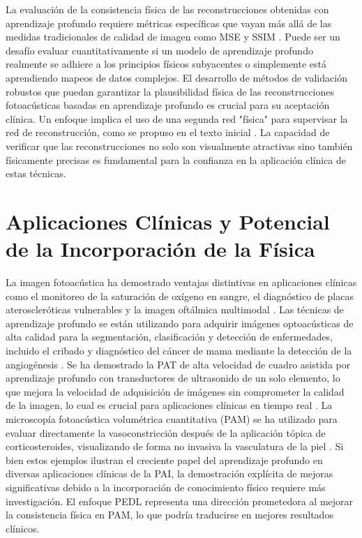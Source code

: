 La evaluación de la consistencia física de las reconstrucciones obtenidas con aprendizaje profundo requiere métricas específicas que vayan más allá de las medidas tradicionales de calidad de imagen como MSE y SSIM \cite{hauptmann_2024}. Puede ser un desafío evaluar cuantitativamente si un modelo de aprendizaje profundo realmente se adhiere a los principios físicos subyacentes o simplemente está aprendiendo mapeos de datos complejos. El desarrollo de métodos de validación robustos que puedan garantizar la plausibilidad física de las reconstrucciones fotoacústicas basadas en aprendizaje profundo es crucial para su aceptación clínica. Un enfoque implica el uso de una segunda red "física" para supervisar la red de reconstrucción, como se propuso en el texto inicial \cite{resolution_enhancement_2024}. La capacidad de verificar que las reconstrucciones no solo son visualmente atractivas sino también físicamente precisas es fundamental para la confianza en la aplicación clínica de estas técnicas.

\section{Aplicaciones Clínicas y Potencial de la Incorporación de la Física}

La imagen fotoacústica ha demostrado ventajas distintivas en aplicaciones clínicas como el monitoreo de la saturación de oxígeno en sangre, el diagnóstico de placas ateroscleróticas vulnerables y la imagen oftálmica multimodal \cite{resolution_enhancement_2024}. Las técnicas de aprendizaje profundo se están utilizando para adquirir imágenes optoacústicas de alta calidad para la segmentación, clasificación y detección de enfermedades, incluido el cribado y diagnóstico del cáncer de mama mediante la detección de la angiogénesis \cite{deep_learning_reconstruction_2024}. Se ha demostrado la PAT de alta velocidad de cuadro asistida por aprendizaje profundo con transductores de ultrasonido de un solo elemento, lo que mejora la velocidad de adquisición de imágenes sin comprometer la calidad de la imagen, lo cual es crucial para aplicaciones clínicas en tiempo real \cite{deep_learning_bilab_2024}. La microscopía fotoacústica volumétrica cuantitativa (PAM) se ha utilizado para evaluar directamente la vasoconstricción después de la aplicación tópica de corticosteroides, visualizando de forma no invasiva la vasculatura de la piel \cite{recent_advances_dl_2023}. Si bien estos ejemplos ilustran el creciente papel del aprendizaje profundo en diversas aplicaciones clínicas de la PAI, la demostración explícita de mejoras significativas debido a la incorporación de conocimiento físico requiere más investigación. El enfoque PEDL \cite{enhanced_pam_2024} representa una dirección prometedora al mejorar la consistencia física en PAM, lo que podría traducirse en mejores resultados clínicos.

